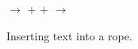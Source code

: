 \begin{figure}[t]
  \centering
   \enspace$\rightarrow$\enspace
   \enspace$+$\enspace {} \enspace$+$\enspace {}
  \enspace$\rightarrow$\enspace {}
  \caption{Inserting text into a rope.}
  \label{fig:insertion}
\end{figure}
